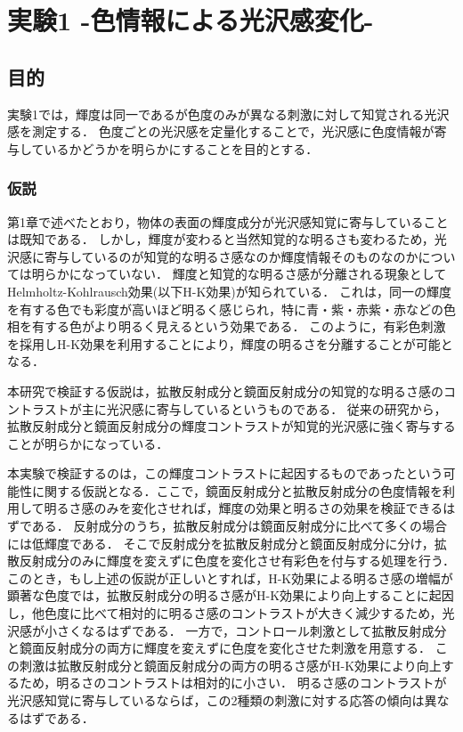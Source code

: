\chapter{実験1 -色情報による光沢感変化-}

    \section{目的}
        実験1では，輝度は同一であるが色度のみが異なる刺激に対して知覚される光沢感を測定する．
        色度ごとの光沢感を定量化することで，光沢感に色度情報が寄与しているかどうかを明らかにすることを目的とする．

        \subsection{仮説}

            第1章で述べたとおり，物体の表面の輝度成分が光沢感知覚に寄与していることは既知である．
            しかし，輝度が変わると当然知覚的な明るさも変わるため，光沢感に寄与しているのが知覚的な明るさ感なのか輝度情報そのものなのかについては明らかになっていない．
            輝度と知覚的な明るさ感が分離される現象としてHelmholtz-Kohlrausch効果(以下H-K効果)が知られている．
            これは，同一の輝度を有する色でも彩度が高いほど明るく感じられ，特に青・紫・赤紫・赤などの色相を有する色がより明るく見えるという効果である．
            このように，有彩色刺激を採用しH-K効果を利用することにより，輝度の明るさを分離することが可能となる．

            本研究で検証する仮説は，拡散反射成分と鏡面反射成分の知覚的な明るさ感のコントラストが主に光沢感に寄与しているというものである．
            従来の研究から，拡散反射成分と鏡面反射成分の輝度コントラストが知覚的光沢感に強く寄与することが明らかになっている．\cite{}

            本実験で検証するのは，この輝度コントラストに起因するものであったという可能性に関する仮説となる．ここで，鏡面反射成分と拡散反射成分の色度情報を利用して明るさ感のみを変化させれば，輝度の効果と明るさの効果を検証できるはずである．
            反射成分のうち，拡散反射成分は鏡面反射成分に比べて多くの場合には低輝度である．
            そこで反射成分を拡散反射成分と鏡面反射成分に分け，拡散反射成分のみに輝度を変えずに色度を変化させ有彩色を付与する処理を行う．
            このとき，もし上述の仮説が正しいとすれば，H-K効果による明るさ感の増幅が顕著な色度では，拡散反射成分の明るさ感がH-K効果により向上することに起因し，他色度に比べて相対的に明るさ感のコントラストが大きく減少するため，光沢感が小さくなるはずである．
            一方で，コントロール刺激として拡散反射成分と鏡面反射成分の両方に輝度を変えずに色度を変化させた刺激を用意する．
            この刺激は拡散反射成分と鏡面反射成分の両方の明るさ感がH-K効果により向上するため，明るさのコントラストは相対的に小さい．
            明るさ感のコントラストが光沢感知覚に寄与しているならば，この2種類の刺激に対する応答の傾向は異なるはずである．

